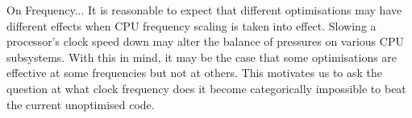 


On Frequency...
It is reasonable to expect that different optimisations may have different effects when CPU frequency scaling is taken into effect. Slowing a processor's clock speed down may alter the balance of pressures on various CPU subsystems. With this in mind, it may be the case that some optimisations are effective at some frequencies but not at others. This motivates us to ask the question at what clock frequency does it become categorically impossible to beat the current unoptimised code.
